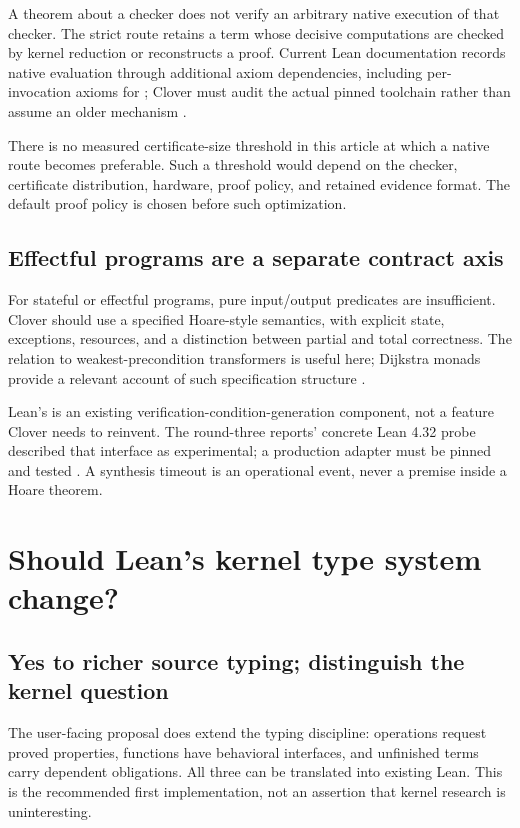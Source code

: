 \documentclass[11pt,a4paper]{article}
\newcommand{\code}[1]{\texttt{\detokenize{#1}}}
\theoremstyle{definition}
\theoremstyle{remark}
\begin{document}
A theorem about a checker does not verify an arbitrary native execution of that
checker. The strict route retains a term whose decisive computations are checked
by kernel reduction or reconstructs a proof. Current Lean documentation records
native evaluation through additional axiom dependencies, including per-invocation
axioms for \code{native_decide}; Clover must audit the actual pinned toolchain
rather than assume an older mechanism \cite{lean-axioms}.

There is no measured certificate-size threshold in this article at which a
native route becomes preferable. Such a threshold would depend on the checker,
certificate distribution, hardware, proof policy, and retained evidence format.
The default proof policy is chosen before such optimization.

\subsection{Effectful programs are a separate contract axis}

For stateful or effectful programs, pure input/output predicates are insufficient.
Clover should use a specified Hoare-style semantics, with explicit state,
exceptions, resources, and a distinction between partial and total correctness.
The relation to weakest-precondition transformers is useful here; Dijkstra
monads provide a relevant account of such specification structure
\cite{dijkstra}.

Lean's \code{mvcgen} is an existing verification-condition-generation component,
not a feature Clover needs to reinvent. The round-three reports' concrete
Lean 4.32 probe described that interface as experimental; a production adapter
must be pinned and tested \cite{mvcgen,syn-b}. A synthesis timeout is an
operational event, never a premise inside a Hoare theorem.

\section{Should Lean's kernel type system change?}\label{sec:kernel}

\subsection{Yes to richer source typing; distinguish the kernel question}

The user-facing proposal does extend the typing discipline: operations request
proved properties, functions have behavioral interfaces, and unfinished terms
carry dependent obligations. All three can be translated into existing Lean.
This is the recommended first implementation, not an assertion that kernel
research is uninteresting.
\end{document}
